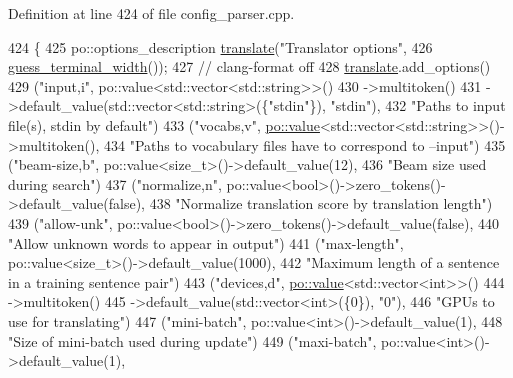 Definition at line 424 of file config\+\_\+parser.\+cpp.


\begin{DoxyCode}
424                                                                   \{
425   po::options\_description \hyperlink{amunmt_8cpp_a86ebd9110196f3b5328ad3c3d31cd007}{translate}(\textcolor{stringliteral}{"Translator options"},
426                                     \hyperlink{namespacemarian_aa656da9ccb3e53462fef9b9745616b57}{guess\_terminal\_width}());
427   \textcolor{comment}{// clang-format off}
428   \hyperlink{amunmt_8cpp_a86ebd9110196f3b5328ad3c3d31cd007}{translate}.add\_options()
429     (\textcolor{stringliteral}{"input,i"}, po::value<std::vector<std::string>>()
430       ->multitoken()
431       ->default\_value(std::vector<std::string>(\{\textcolor{stringliteral}{"stdin"}\}), \textcolor{stringliteral}{"stdin"}),
432       \textcolor{stringliteral}{"Paths to input file(s), stdin by default"})
433     (\textcolor{stringliteral}{"vocabs,v"}, \hyperlink{namespacemarian_1_1keywords_ac70de1b4c3cf6b7080cf5086f2963fd8}{po::value}<std::vector<std::string>>()->multitoken(),
434       \textcolor{stringliteral}{"Paths to vocabulary files have to correspond to --input"})
435     (\textcolor{stringliteral}{"beam-size,b"}, po::value<size\_t>()->default\_value(12),
436       \textcolor{stringliteral}{"Beam size used during search"})
437     (\textcolor{stringliteral}{"normalize,n"}, po::value<bool>()->zero\_tokens()->default\_value(\textcolor{keyword}{false}),
438       \textcolor{stringliteral}{"Normalize translation score by translation length"})
439     (\textcolor{stringliteral}{"allow-unk"}, po::value<bool>()->zero\_tokens()->default\_value(\textcolor{keyword}{false}),
440       \textcolor{stringliteral}{"Allow unknown words to appear in output"})
441     (\textcolor{stringliteral}{"max-length"}, po::value<size\_t>()->default\_value(1000),
442       \textcolor{stringliteral}{"Maximum length of a sentence in a training sentence pair"})
443     (\textcolor{stringliteral}{"devices,d"}, \hyperlink{namespacemarian_1_1keywords_ac70de1b4c3cf6b7080cf5086f2963fd8}{po::value}<std::vector<int>>()
444       ->multitoken()
445       ->default\_value(std::vector<int>(\{0\}), \textcolor{stringliteral}{"0"}),
446       \textcolor{stringliteral}{"GPUs to use for translating"})
447     (\textcolor{stringliteral}{"mini-batch"}, po::value<int>()->default\_value(1),
448       \textcolor{stringliteral}{"Size of mini-batch used during update"})
449     (\textcolor{stringliteral}{"maxi-batch"}, po::value<int>()->default\_value(1),

\end{DoxyCode}
